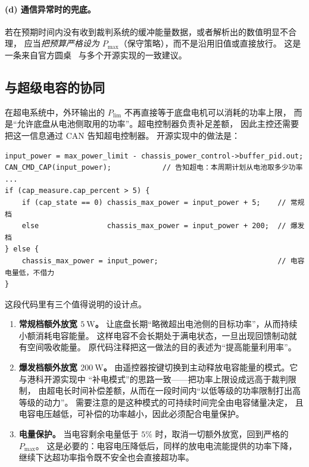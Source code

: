 \documentclass[cn,blue,11pt,device=normal]{elegantnote}
\newcommand{\Plim}{P_{\mathrm{lim}}{}}
\newcommand{\Pmax}{P_{\max}{}}
\begin{document}
\paragraph{(d) 通信异常时的兜底。}
若在预期时间内没有收到裁判系统的缓冲能量数据，或者解析出的数值明显不合理，
应当\emph{把预算严格设为 $\Pmax$}（保守策略），而不是沿用旧值或直接放行。
这是一条来自官方圆桌~\cite{rmroundtable006} 与多个开源实现的一致建议。

\subsection{与超级电容的协同}

在超电系统中，外环输出的 $\Plim$ 不再直接等于底盘电机可以消耗的功率上限，
而是“允许底盘从电池侧取用的功率”。超电控制器负责补足差额，
因此主控还需要把这一信息通过 CAN 告知超电控制器。
开源实现中的做法是：

\begin{lstlisting}[style=cstyle, numbers=none]
input_power = max_power_limit - chassis_power_control->buffer_pid.out;
CAN_CMD_CAP(input_power);            // 告知超电：本周期计划从电池取多少功率
...
if (cap_measure.cap_percent > 5) {
    if (cap_state == 0) chassis_max_power = input_power + 5;    // 常规档
    else                chassis_max_power = input_power + 200;  // 爆发档
} else {
    chassis_max_power = input_power;                            // 电容电量低，不借力
}
\end{lstlisting}

这段代码里有三个值得说明的设计点。

\begin{enumerate}
  \item \textbf{常规档额外放宽 $5\ \mathrm{W}$。}
  让底盘长期“略微超出电池侧的目标功率”，从而持续小额消耗电容能量。
  这样电容不会长期处于满电状态，一旦出现回馈制动就有空间吸收能量。
  原代码注释把这一做法的目的表述为“提高能量利用率”。
  \item \textbf{爆发档额外放宽 $200\ \mathrm{W}$。}
  由遥控器按键切换到主动释放电容能量的模式。它与港科开源实现中
  “补电模式”的思路一致——把功率上限设成远高于裁判限制，
  由超电长时间补偿差额，从而在一段时间内“以低等级的功率限制打出高等级的动力”。
  需要注意的是这种模式的可持续时间完全由电容储量决定，
  且电容电压越低，可补偿的功率越小，因此必须配合电量保护。
  \item \textbf{电量保护。}
  当电容剩余电量低于 $5\%$ 时，取消一切额外放宽，回到严格的 $\Pmax$。
  这是必要的：电容电压降低后，同样的放电电流能提供的功率下降，
  继续下达超功率指令既不安全也会直接超功率。
\end{enumerate}
\end{document}
